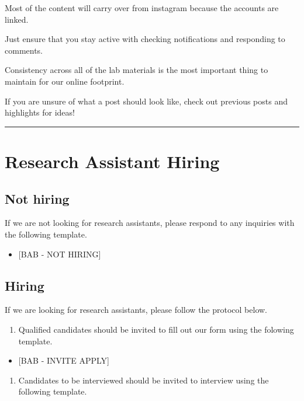 \documentclass[]{book}
\providecommand{\tightlist}{%
  \setlength{\itemsep}{0pt}\setlength{\parskip}{0pt}}
\begin{document}
Most of the content will carry over from instagram because the accounts
are linked.

Just ensure that you stay active with checking notifications and
responding to comments.

Consistency across all of the lab materials is the most important thing
to maintain for our online footprint.

If you are unsure of what a post should look like, check out previous
posts and highlights for ideas!

\begin{center}\rule{0.5\linewidth}{0.5pt}\end{center}

\section{Research Assistant Hiring}\label{research-assistant-hiring}

\subsection{Not hiring}\label{not-hiring}

If we are not looking for research assistants, please respond to any
inquiries with the following template.

\begin{itemize}
\tightlist
\item
  {[}BAB - NOT HIRING{]}
\end{itemize}

\subsection{Hiring}\label{hiring}

If we are looking for research assistants, please follow the protocol
below.

\begin{enumerate}
\def\labelenumi{\arabic{enumi}.}
\tightlist
\item
  Qualified candidates should be invited to fill out our form using the
  folowing template.
\end{enumerate}

\begin{itemize}
\tightlist
\item
  {[}BAB - INVITE APPLY{]}
\end{itemize}

\begin{enumerate}
\def\labelenumi{\arabic{enumi}.}
\setcounter{enumi}{1}
\tightlist
\item
  Candidates to be interviewed should be invited to interview using the
  following template.
\end{enumerate}
\end{document}
